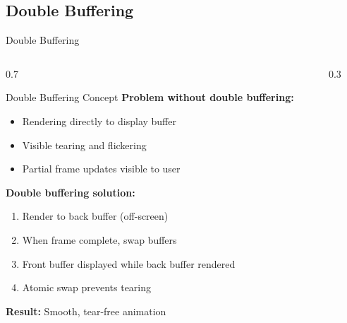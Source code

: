 \subsection{Double Buffering}
\begin{frame}{Double Buffering}
  \footnotesize
  \begin{columns}
    \begin{column}{0.7\textwidth}
      \begin{raybox}{Double Buffering Concept}
        \textbf{Problem without double buffering:}
        \begin{itemize}
          \item Rendering directly to display buffer
          \item Visible tearing and flickering
          \item Partial frame updates visible to user
        \end{itemize}

        \vspace{0.3cm}
        \textbf{Double buffering solution:}
        \begin{enumerate}
          \item Render to back buffer (off-screen)
          \item When frame complete, swap buffers
          \item Front buffer displayed while back buffer rendered
          \item Atomic swap prevents tearing
        \end{enumerate}

        \vspace{0.2cm}
        \textbf{Result:} Smooth, tear-free animation
      \end{raybox}
    \end{column}
    \begin{column}{0.3\textwidth}
\end{column}
\end{columns}
\end{frame}
